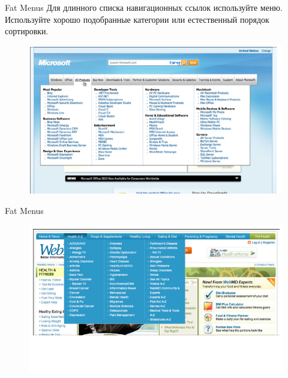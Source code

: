 \documentclass{beamer}
\begin{document}
\begin{frame}[t]{Fat Menus}
	Для длинного списка навигационных ссылок используйте меню. Используйте хорошо подобранные категории или естественный порядок сортировки.
	\begin{figure}[h]
		\centering
		\includegraphics[scale=0.5]{images/lec07-pic37.png}
	\end{figure}
\end{frame}	

\begin{frame}[t]{Fat Menus}
	\begin{figure}[h]
		\centering
		\includegraphics[scale=0.5]{images/lec07-pic38.png}
	\end{figure}
\end{frame}	
\end{document}
